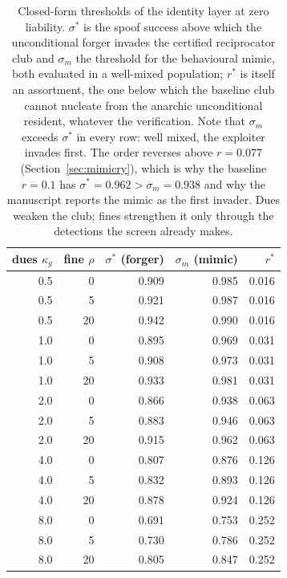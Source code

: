 \begin{table}[t]
\centering
\caption{Closed-form thresholds of the identity layer at zero
liability.  $\sigma^{*}$ is the spoof success above which the
unconditional forger invades the certified reciprocator club and
$\sigma_m$ the threshold for the behavioural mimic, both evaluated
in a well-mixed population; $r^{*}$ is itself an assortment, the one
below which the baseline club cannot nucleate from the anarchic
unconditional resident, whatever the verification.  Note that
$\sigma_m$ exceeds $\sigma^{*}$ in every row: well mixed, the
exploiter invades first.  The order reverses above $r = 0.077$
(Section~\ref{sec:mimicry}), which is why the baseline $r = 0.1$ has
$\sigma^{*} = 0.962 > \sigma_m = 0.938$ and why the manuscript
reports the mimic as the first invader.  Dues weaken the club; fines
strengthen it only through the detections the screen already makes.}
\label{tab:thresholds}
\small
\begin{tabular}{rrrrr}
\toprule
dues $\kappa_g$ & fine $\rho$ & $\sigma^{*}$ (forger) & $\sigma_m$ (mimic) & $r^{*}$ \\
\midrule
0.5 & 0 & 0.909 & 0.985 & 0.016 \\
0.5 & 5 & 0.921 & 0.987 & 0.016 \\
0.5 & 20 & 0.942 & 0.990 & 0.016 \\
1.0 & 0 & 0.895 & 0.969 & 0.031 \\
1.0 & 5 & 0.908 & 0.973 & 0.031 \\
1.0 & 20 & 0.933 & 0.981 & 0.031 \\
2.0 & 0 & 0.866 & 0.938 & 0.063 \\
2.0 & 5 & 0.883 & 0.946 & 0.063 \\
2.0 & 20 & 0.915 & 0.962 & 0.063 \\
4.0 & 0 & 0.807 & 0.876 & 0.126 \\
4.0 & 5 & 0.832 & 0.893 & 0.126 \\
4.0 & 20 & 0.878 & 0.924 & 0.126 \\
8.0 & 0 & 0.691 & 0.753 & 0.252 \\
8.0 & 5 & 0.730 & 0.786 & 0.252 \\
8.0 & 20 & 0.805 & 0.847 & 0.252 \\
\bottomrule
\end{tabular}
\end{table}
